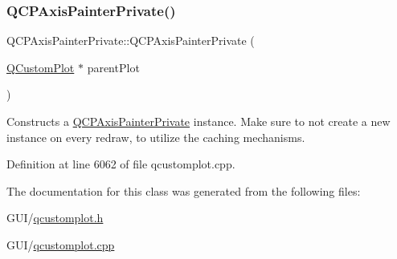 \subsubsection{\texorpdfstring{Q\+C\+P\+Axis\+Painter\+Private()}{QCPAxisPainterPrivate()}}
{\footnotesize\ttfamily Q\+C\+P\+Axis\+Painter\+Private\+::\+Q\+C\+P\+Axis\+Painter\+Private (\begin{DoxyParamCaption}\item[{\hyperlink{class_q_custom_plot}{Q\+Custom\+Plot} $\ast$}]{parent\+Plot }\end{DoxyParamCaption})\hspace{0.3cm}{\ttfamily [explicit]}}

Constructs a \hyperlink{class_q_c_p_axis_painter_private}{Q\+C\+P\+Axis\+Painter\+Private} instance. Make sure to not create a new instance on every redraw, to utilize the caching mechanisms. 

Definition at line 6062 of file qcustomplot.\+cpp.



The documentation for this class was generated from the following files\+:\begin{DoxyCompactItemize}
\item 
G\+U\+I/\hyperlink{qcustomplot_8h}{qcustomplot.\+h}\item 
G\+U\+I/\hyperlink{qcustomplot_8cpp}{qcustomplot.\+cpp}\end{DoxyCompactItemize}

